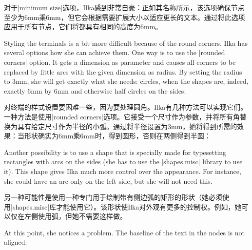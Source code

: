 对于|minimum size|选项，Ilka感到非常自豪：正如其名称所示，该选项确保节点至少为6mm乘6mm，但它会根据需要扩展大小以适应更长的文本。通过将此选项应用于所有节点，它们将都具有相同的高度为6mm。

Styling the terminals is a bit more difficult because of the round corners.
Ilka has several options how she can achieve them. One way is to use the
|rounded corners| option. It gets a dimension as parameter and causes all
corners to be replaced by little arcs with the given dimension as radius. By
setting the radius to 3mm, she will get exactly what she needs: circles, when
the shapes are, indeed, exactly 6mm by 6mm and otherwise half circles on the
sides:

对终端的样式设置要困难一些，因为要处理圆角。Ilka有几种方法可以实现它们。一种方法是使用|rounded corners|选项。它接受一个尺寸作为参数，并将所有角替换为具有给定尺寸作为半径的小弧。通过将半径设置为3mm，她将得到所需的效果：当形状确实为6mm乘6mm时，得到圆形，否则在两侧得到半圆：
%
\begin{codeexample}[preamble={\usetikzlibrary{positioning}}]
\end{codeexample}

Another possibility is to use a shape that is specially made for typesetting
rectangles with arcs on the sides (she has to use the |shapes.misc| library to
use it). This shape gives Ilka much more control over the appearance. For
instance, she could have an arc only on the left side, but she will not need
this.

另一种可能性是使用一种专门用于绘制带有侧边弧的矩形的形状（她必须使用|shapes.misc|库才能使用它）。该形状使Ilka对外观有更多的控制权。例如，她可以仅在左侧使用弧，但她不需要这样做。

%
\begin{codeexample}[preamble={\usetikzlibrary{positioning,shapes.misc}}]
\end{codeexample}
%
At this point, she notices a problem. The baseline of the text in the nodes is
not aligned:


